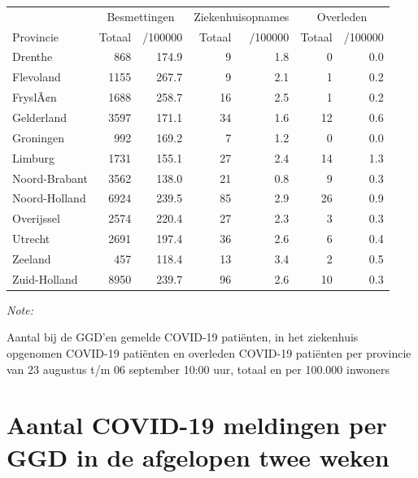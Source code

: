 \documentclass[
  english,
  man,floatsintext]{apa6}
\begin{document}
\begin{table}
\centering
\begin{threeparttable}
\begin{tabular}{lrrrrrr}
\toprule
\multicolumn{1}{c}{ } & \multicolumn{2}{c}{Besmettingen} & \multicolumn{2}{c}{Ziekenhuisopnames} & \multicolumn{2}{c}{Overleden} \\
\cmidrule(l{3pt}r{3pt}){2-3} \cmidrule(l{3pt}r{3pt}){4-5} \cmidrule(l{3pt}r{3pt}){6-7}
Provincie & Totaal & /100000 & Totaal & /100000 & Totaal & /100000\\
\midrule
Drenthe & 868 & 174.9 & 9 & 1.8 & 0 & 0.0\\
Flevoland & 1155 & 267.7 & 9 & 2.1 & 1 & 0.2\\
FryslÃ¢n & 1688 & 258.7 & 16 & 2.5 & 1 & 0.2\\
Gelderland & 3597 & 171.1 & 34 & 1.6 & 12 & 0.6\\
Groningen & 992 & 169.2 & 7 & 1.2 & 0 & 0.0\\
Limburg & 1731 & 155.1 & 27 & 2.4 & 14 & 1.3\\
Noord-Brabant & 3562 & 138.0 & 21 & 0.8 & 9 & 0.3\\
Noord-Holland & 6924 & 239.5 & 85 & 2.9 & 26 & 0.9\\
Overijssel & 2574 & 220.4 & 27 & 2.3 & 3 & 0.3\\
Utrecht & 2691 & 197.4 & 36 & 2.6 & 6 & 0.4\\
Zeeland & 457 & 118.4 & 13 & 3.4 & 2 & 0.5\\
Zuid-Holland & 8950 & 239.7 & 96 & 2.6 & 10 & 0.3\\
\bottomrule
\end{tabular}
\begin{tablenotes}
\item \textit{Note: } 
\item Aantal bij de GGD’en gemelde COVID-19 patiënten, in het ziekenhuis opgenomen COVID-19 patiënten en overleden COVID-19 patiënten per provincie van 23 augustus t/m 06 september 10:00 uur, totaal en per 100.000 inwoners
\end{tablenotes}
\end{threeparttable}
\end{table}

\newpage

\hypertarget{aantal-covid-19-meldingen-per-ggd-in-de-afgelopen-twee-weken}{%
\section{Aantal COVID-19 meldingen per GGD in de afgelopen twee weken}\label{aantal-covid-19-meldingen-per-ggd-in-de-afgelopen-twee-weken}}
\end{document}
